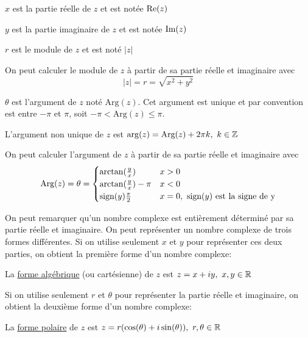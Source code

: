 \begin{definition}
    $x$ est la partie réelle de $z$ et est notée $\text{Re}(z)$
\end{definition}
\begin{definition}
    $y$ est la partie imaginaire de $z$ et est notée $\text{Im}(z)$
\end{definition}
\begin{definition}
    $r$ est le module de $z$ et est noté $|z|$ 
\end{definition}
\begin{lemma} On peut calculer le module de $z$ à partir de sa partie réelle et imaginaire avec 
\[|z| = r = \sqrt{x^2 + y^2}\] 
\end{lemma}
\begin{definition}
    $\theta$ est l'argument de $z$ noté $\text{Arg}(z)$. Cet argument est unique et par convention est entre $-\pi$ et $\pi$, soit $-\pi < \text{Arg}(z) \leq \pi$.
\end{definition}
\begin{definition}
    L'argument non unique de $z$ est $\arg(z) = \text{Arg}(z) + 2\pi k, \ k \in \mathbb{Z}$
\end{definition}
\begin{lemma}
    On peut calculer l'argument de $z$ à partir de sa partie réelle et imaginaire avec
    \[\textup{Arg}(z) = \theta =
    \begin{cases}
        \arctan(\frac{y}{x})       & x > 0                            \\
        \arctan(\frac{y}{x}) - \pi & x < 0                            \\
        \textup{sign}(y)\frac{\pi}{2}           & x = 0, \ \textup{sign}(y) \ \textup{est la signe de y}
    \end{cases}\]
\end{lemma}
On peut remarquer qu'un nombre complexe est entièrement déterminé par sa partie réelle et imaginaire. On peut représenter un nombre complexe de trois formes différentes. Si on utilise seulement $x$ et $y$ pour représenter ces deux parties, on obtient la première forme d'un nombre complexe:
\begin{definition}
    La \underline{forme algébrique} (ou cartésienne) de $z$ est $z = x + iy, \ x, y \in \mathbb{R}$
\end{definition}
Si on utilise seulement $r$ et $\theta$ pour représenter la partie réelle et imaginaire, on obtient la deuxième forme d'un nombre complexe:
\begin{definition}
    La \underline{forme polaire} de $z$ est $z = r(\cos(\theta)+i\sin(\theta)), \ r, \theta \in \mathbb{R}$
\end{definition}
